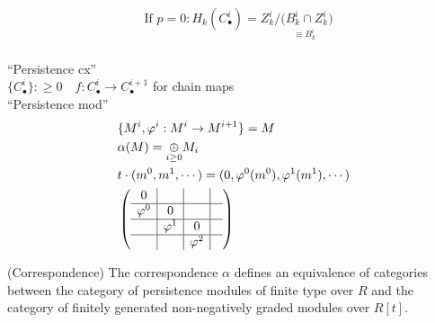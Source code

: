 \documentclass[11pt,a4paper]{report}
\begin{document}
              \begin{align*}
                &\textrm{If } p = 0: H_k(C_\bullet^i) = Z_k^i / \underset{\equiv B_k^i}{(B_k^i \cap Z_k^i})
              \end{align*}
              \\
              ``Persistence cx''\\
              $\{C_\bullet^i\}: \ge 0 \quad f: C_\bullet^i \rightarrow C_\bullet^{i+1}$ for chain maps\\
              ``Persistence mod''\\
              \begin{align*}
                &\{M^i, \varphi^i: M^i \rightarrow M^{i+1}\} = M\\
                &\alpha(M) = \underset{i \ge 0}{\oplus} M_i\\
                &t \cdot(m^0,m^1, \cdots) = (0, \varphi^0(m^0), \varphi^1(m^1), \cdots)\\
                &\left(\begin{array}{c|c|c|c}
                        0 &&& \\ \hline \varphi^0 & 0 && \\ \hline & \varphi^1 & 0 & \\ \hline && \varphi^2 &
                      \end{array}\right)
              \end{align*}
              
              \begin{thm} (Correspondence) The correspondence $\alpha$ defines an equivalence of categories between the category of persistence modules of finite type over $R$ and the category of finitely generated non-negatively graded modules over $R[t]$.
              \end{thm}

              
\end{document}
